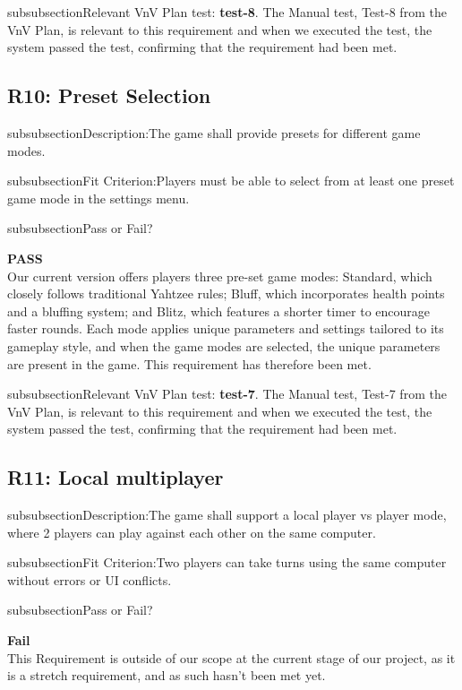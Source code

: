 \documentclass[12pt, titlepage]{article}
\begin{document}
\*subsubsection{Relevant VnV Plan test: } \textbf{test-8}.  The Manual test, Test-8 from the VnV Plan, is relevant to this requirement and when we executed the test, the system passed the test, confirming that the requirement had been met.

\subsection{R10: Preset Selection} 

\*subsubsection{Description:}The game shall provide presets for different game modes.

\*subsubsection{Fit Criterion:}Players must be able to select from at least one preset game mode in the settings menu.

\*subsubsection{Pass or Fail?} 

 \noindent \textbf{PASS}\\
 
 \noindent Our current version offers players three pre-set game modes: Standard, which closely follows traditional Yahtzee rules; Bluff, which incorporates health points and a bluffing system; and Blitz, which features a shorter timer to encourage faster rounds. Each mode applies unique parameters and settings tailored to its gameplay style, and when the game modes are selected, the unique parameters are present in the game. This requirement has therefore been met.

\*subsubsection{Relevant VnV Plan test: } \textbf{test-7}.  The Manual test, Test-7 from the VnV Plan, is relevant to this requirement and when we executed the test, the system passed the test, confirming that the requirement had been met.

\subsection{R11: Local multiplayer} 

\*subsubsection{Description:}The game shall support a local player vs player mode, where 2 players can play against each other on the same computer.

\*subsubsection{Fit Criterion:}Two players can take turns using the same computer without errors or UI conflicts.

\*subsubsection{Pass or Fail?} 

 \noindent \textbf{Fail}\\
 
 \noindent  This Requirement is outside of our scope at the current stage of our project, as it is a stretch requirement, and as such hasn't been met yet.
\end{document}
